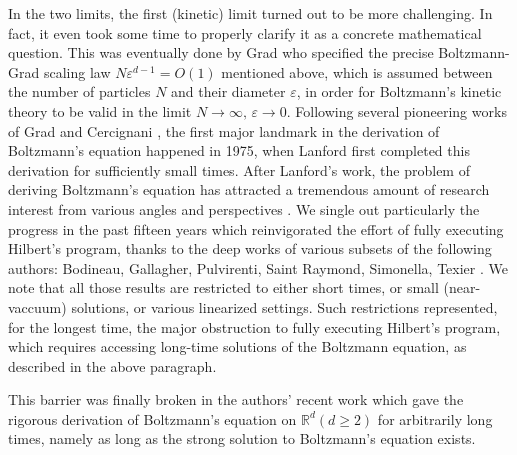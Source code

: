 \documentclass[10pt, reqno]{amsart}
\newcommand{\Rb}{\mathbb R}
\theoremstyle{definition}
\theoremstyle{remark}
\numberwithin{equation}{section}
\begin{document}
In the two limits, the first (kinetic) limit turned out to be more challenging. In fact, it even took some time to properly clarify it as a concrete mathematical question. This was eventually done by Grad \cite{Grad58} who specified the precise Boltzmann-Grad scaling law $N\varepsilon^{d-1}=O(1)$ mentioned above, which is assumed between the number of particles $N$ and their diameter $\varepsilon$, in order for Boltzmann's kinetic theory to be valid in the limit $N\to \infty,\,\varepsilon\to 0$. Following several pioneering works of Grad \cite{Grad58} and Cercignani \cite{Cer72}, the first major landmark in the derivation of Boltzmann's equation happened in 1975, when Lanford \cite{Lan75} first completed this derivation for sufficiently small times. After Lanford's work, the problem of deriving Boltzmann's equation has attracted a tremendous amount of research interest from various angles and perspectives \cite{King75, Kac56, MS11, MT12, MM13, IP89, OVY93, SpohnBook, UT06, R03}. We single out particularly the progress in the past fifteen years which reinvigorated the effort of fully executing Hilbert's program, thanks to the deep works of various subsets of the following authors: Bodineau, Gallagher, Pulvirenti, Saint Raymond, Simonella, Texier \cite{GST14, PS17, PS21, BGS16, BGS17, BGS18, BGSS18, BGSS22_2, BGSS20, BGSS20_2, BGSS22, BGSS23}. We note that all those results are restricted to either  short times, or small (near-vaccuum) solutions, or various linearized settings. Such restrictions represented, for the longest time, the major obstruction to fully executing Hilbert's program, which requires accessing long-time solutions of the Boltzmann equation, as described in the above paragraph.  

This barrier was finally broken in the authors' recent work \cite{DHM24} which gave the rigorous derivation of Boltzmann's equation on $\Rb^d (d\geq 2)$  for arbitrarily long times, namely as long as the strong solution to Boltzmann's equation exists. 
\end{document}
